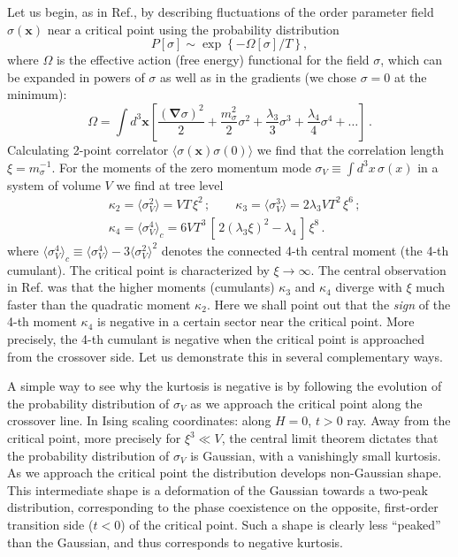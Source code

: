 \documentclass[prl,twocolumn,nofootinbib]{revtex4}
\newcommand\la{\langle}
\newcommand\ra{\rangle}
\newcommand\xis{\xi}
\begin{document}
Let us begin, as in Ref.\cite{Stephanov:2004wx}, by describing
fluctuations of the order parameter field $\sigma(\bm x)$ near a
critical point using the probability distribution
\begin{equation}
  \label{eq:P-Omega-sigma}
  P[\sigma] \sim \exp\left\{ - \Omega[\sigma]/T\right\},
\end{equation}
where $\Omega$ is the effective action (free energy) functional for
the field $\sigma$, which can be expanded in powers of $\sigma$ as
well as in the gradients (we chose $\sigma=0$ at the minimum):
\begin{equation}
  \label{eq:Omega-sigma}
  \Omega%
=\! \int\!d^3\bm x\left[
\frac{(\bm\nabla\sigma)^2}{2} +
\frac{m_\sigma^2}2 \sigma^2 
+ \frac{\lambda_3}{3}\sigma^3
+ \frac{\lambda_4}{4}\sigma^4 + \ldots
\right]
\,.
\end{equation}
Calculating 2-point correlator $\la\sigma(\bm x)\sigma(0)\ra$ we
find that the correlation length $\xis=m_\sigma^{-1}$.
For the moments of the zero momentum mode $\sigma_V\equiv
\int\!d^3x\,\sigma(x)$
in a system of volume $V$ we find at tree level
\begin{equation}
  \label{eq:sigma-moments}
  \begin{split}
  &  \kappa_2=\la \sigma_V^2 \ra = V T\,\xis^2\,;
\qquad
\kappa_3=\la \sigma_V^3 \ra = {2 \lambda_3 VT^2}\, \xis^6\,;
\\
  &\kappa_4=\la \sigma_V^4 \ra_c
= {6VT^3}\, [\,2(\lambda_3\xis)^{2} - \lambda_4\,]\, \xis^8\,.   
  \end{split}
\end{equation} 
where $\la\sigma_V^4 \ra_c \equiv \la \sigma_V^4 \ra - 3\la \sigma_V^2
\ra^2$ denotes the connected 4-th central moment (the
4-th cumulant). The critical point is characterized by $\xis\to\infty$. The
central observation in Ref.\cite{Stephanov:2008qz} was that the
higher moments (cumulants) $\kappa_3$ and $\kappa_4$ diverge with
$\xis$ much faster than the quadratic moment $\kappa_2$. Here we shall
 point out that the {\em sign} of the 4-th moment
$\kappa_4$ is negative in a certain sector near the critical
point. More precisely, the 4-th cumulant is negative when the
critical point is approached from the crossover side.
Let us demonstrate this in several complementary ways.

A simple way to see why the kurtosis is negative is by following the
evolution of the probability distribution of $\sigma_V$ as we approach
the critical point along the crossover line. In Ising scaling
coordinates: along $H=0$, $t>0$ ray. Away from the critical point,
more precisely for $\xi^3\ll V$, the central limit theorem dictates
that the probability distribution of $\sigma_V$ is Gaussian, with a
vanishingly small kurtosis. As we approach the critical point
the distribution develops non-Gaussian shape. This intermediate shape
is a deformation of the Gaussian towards a two-peak distribution,
corresponding to the phase coexistence on the opposite, first-order
transition side ($t<0$) of the critical point. Such a shape is clearly
less ``peaked'' than the Gaussian, and thus corresponds to negative
kurtosis.
\end{document}
